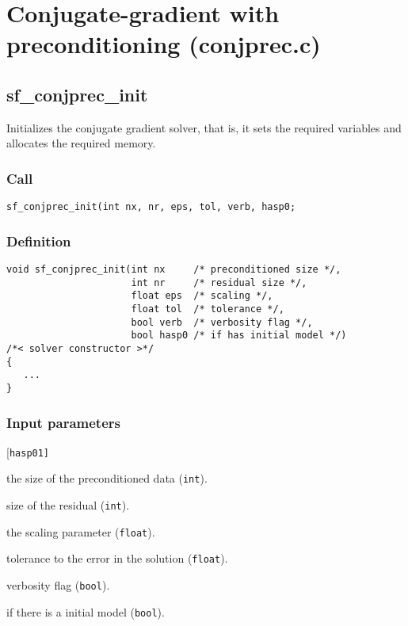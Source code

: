 \section[CG with preconditioning (conjprec.c)]{Conjugate-gradient with preconditioning (conjprec.c)}




\subsection{{sf\_conjprec\_init}}
Initializes the conjugate gradient solver, that is, it sets the required variables and allocates the required memory.

\subsubsection*{Call}
\begin{verbatim}sf_conjprec_init(int nx, nr, eps, tol, verb, hasp0;\end{verbatim}

\subsubsection*{Definition}
\begin{verbatim}
void sf_conjprec_init(int nx     /* preconditioned size */, 
                      int nr     /* residual size */, 
                      float eps  /* scaling */,
                      float tol  /* tolerance */, 
                      bool verb  /* verbosity flag */, 
                      bool hasp0 /* if has initial model */)
/*< solver constructor >*/ 
{
   ...
}
\end{verbatim}

\subsubsection*{Input parameters}
\begin{desclist}{\tt }{\quad}[\tt hasp01]
   \setlength\itemsep{0pt}
   \item[nx1]    the size of the preconditioned data (\texttt{int}). 
   \item[nr1]    size of the residual (\texttt{int}). 
   \item[eps]    the scaling parameter (\texttt{float}). 
   \item[tol1]   tolerance to the error in the solution  (\texttt{float}). 
   \item[verb1]  verbosity flag (\texttt{bool}). 
   \item[hasp01] if there is a initial model (\texttt{bool}).  
\end{desclist}



